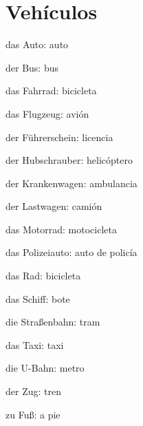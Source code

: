 \section{Vehículos}
\begin{multicols}{2}
\begin{myitemize}
\item das Auto: auto
\item der Bus: bus
\item das Fahrrad: bicicleta
\item das Flugzeug: avión
\item der Führerschein: licencia
\item der Hubschrauber: helicóptero
\item der Krankenwagen: ambulancia
\item der Lastwagen: camión
\item das Motorrad: motocicleta
\item das Polizeiauto: auto de policía
\item das Rad: bicicleta
\item das Schiff: bote
\item die Straßenbahn: tram
\item das Taxi: taxi
\item die U-Bahn: metro
\item der Zug: tren
\item zu Fuß: a pie
\end{myitemize}
\end{multicols}